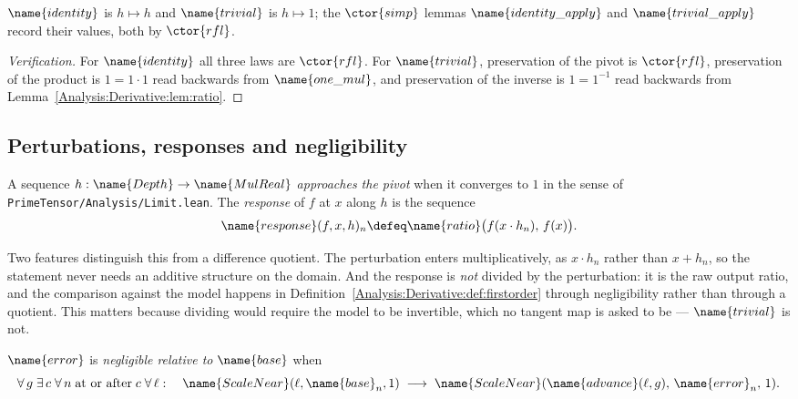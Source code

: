 \begin{definition}
\label{Analysis:Derivative:def:examples}
$\name{identity}$ is $h \mapsto h$ and $\name{trivial}$ is $h \mapsto 1$; the
$\ctor{simp}$ lemmas $\name{identity\_apply}$ and $\name{trivial\_apply}$
record their values, both by $\ctor{rfl}$.
\end{definition}

\begin{proof}[Verification]
For $\name{identity}$ all three laws are $\ctor{rfl}$.  For $\name{trivial}$,
preservation of the pivot is $\ctor{rfl}$, preservation of the product is
$1 = 1 \cdot 1$ read backwards from $\name{one\_mul}$, and preservation of the
inverse is $1 = 1^{-1}$ read backwards from
Lemma~\ref{Analysis:Derivative:lem:ratio}.
\end{proof}

\subsection{Perturbations, responses and negligibility}

\begin{definition}
\label{Analysis:Derivative:def:response}
A sequence $h : \name{Depth} \to \name{MulReal}$ \emph{approaches the pivot}
when it converges to $1$ in the sense of
\texttt{PrimeTensor/Analysis/Limit.lean}.  The \emph{response} of $f$ at $x$
along $h$ is the sequence
\[
  \name{response}(f,x,h)_n \defeq
    \name{ratio}\bigl(f(x \cdot h_n),\, f(x)\bigr).
\]
\end{definition}

Two features distinguish this from a difference quotient.  The perturbation
enters multiplicatively, as $x \cdot h_n$ rather than $x + h_n$, so the
statement never needs an additive structure on the domain.  And the response is
\emph{not} divided by the perturbation: it is the raw output ratio, and the
comparison against the model happens in
Definition~\ref{Analysis:Derivative:def:firstorder} through negligibility
rather than through a quotient.  This matters because dividing would require
the model to be invertible, which no tangent map is asked to be ---
$\name{trivial}$ is not.

\begin{definition}
\label{Analysis:Derivative:def:negligible}
$\name{error}$ is \emph{negligible relative to} $\name{base}$ when
\[
  \forall\, g\;
  \exists\, c\;
  \forall\, n \;\text{at or after}\; c\;
  \forall\, \ell : \quad
  \name{ScaleNear}(\ell, \name{base}_n, 1)
  \;\longrightarrow\;
  \name{ScaleNear}(\name{advance}(\ell,g),\, \name{error}_n,\, 1).
\]
\end{definition}

